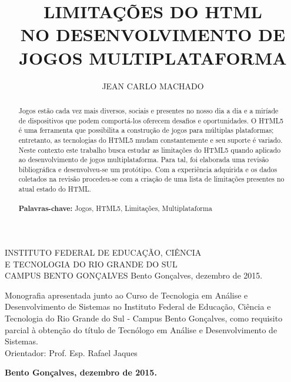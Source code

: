 \documentclass[
12pt,
a4paper,
portuges,
]{report}
\title{\uppercase{Limitações do HTML \\ no desenvolvimento de jogos multiplataforma}}
\author{\uppercase{Jean Carlo Machado}}
\newcommand{\university}{\uppercase{Instituto Federal de Educação, Ciência \\ e Tecnologia do Rio Grande do Sul \\ Campus Bento Gonçalves}}
\newcommand{\locale}{Bento Gonçalves, dezembro de 2015.}
\begin{document}


\begin{titlepage}
    \begin{center}
        {\fontsize{14}{18}\selectfont \university}
        \vfill
        {\fontsize{16}{19}\selectfont \thetitle }
        \vfill
        {\fontsize{12}{15}\selectfont \theauthor}
        \vfill
        {\locale}
    \end{center}
\end{titlepage}


\begin{titlepage}
    \begin{center}
        {\fontsize{14}{18}\selectfont \theauthor}
        \vfill
        {\fontsize{16}{19}\selectfont \thetitle }
        \vfill
        \hfill
        \parbox[s]{8cm}{
        \singlespacing
            Monografia apresentada junto ao Curso
        de Tecnologia em Análise e Desenvolvimento de Sistemas no
    Instituto Federal de Educação, Ciência e Tecnologia do Rio
Grande do Sul - Campus Bento Gonçalves, como requisito parcial à
obtenção do título de Tecnólogo em Análise e Desenvolvimento de Sistemas.
        \\
        Orientador: Prof. Esp. Rafael Jaques
        }
        \vfill
        {\bfseries \locale}
    \end{center}
\end{titlepage}

\onehalfspacing
\renewcommand{\abstractname}{\Large\bfseries RESUMO}
\begin{abstract}
{
Jogos estão cada vez mais diversos, sociais e presentes no nosso dia
a dia e a miríade de dispositivos que podem comportá-los oferecem
desafios e oportunidades. O HTML5 é uma ferramenta que possibilita a
construção de jogos para múltiplas plataformas; entretanto, as tecnologias
do HTML5 mudam constantemente e seu suporte é variado. Neste contexto
este trabalho busca estudar as limitações do HTML5 quando aplicado
ao desenvolvimento de jogos multiplataforma. Para tal, foi elaborada
uma revisão bibliográfica e desenvolveu-se um protótipo. Com a
experiência adquirida e os dados coletados na revisão procedeu-se com
a criação de uma lista de limitações presentes no atual estado do
HTML.
}
\\
\\
{\bfseries Palavras-chave:} Jogos, HTML5, Limitações,
Multiplataforma
\end{abstract}
\end{document}
